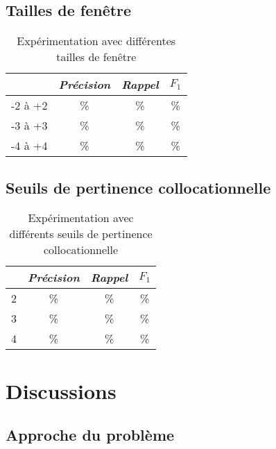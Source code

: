 \documentclass[a4paper]{article}
\begin{document}
	\subsection{Tailles de fenêtre}

		\FloatBarrier

		\begin{table}[h]
			\centering
			\begin{tabular}{l|c|c|c|}
			\cline{2-4}
				                   & \textit{Précision} & \textit{Rappel} & \textit{$F_1$} \\ \hline
			\multicolumn{1}{|l|}{-2 à +2} & \% & \% & \% \\ \hline
			\multicolumn{1}{|l|}{-3 à +3} & \% & \% & \% \\ \hline
			\multicolumn{1}{|l|}{-4 à +4} & \% & \% & \% \\ \hline
			\end{tabular}
			\caption{Expérimentation avec différentes tailles de fenêtre}
		\end{table}

	\subsection{Seuils de pertinence collocationnelle}

		\FloatBarrier

		\begin{table}[h]
			\centering
			\begin{tabular}{l|c|c|c|}
			\cline{2-4}
				                    & \textit{Précision} & \textit{Rappel} & \textit{$F_1$} \\ \hline
			\multicolumn{1}{|l|}{2} & \% & \% & \% \\ \hline
			\multicolumn{1}{|l|}{3} & \% & \% & \% \\ \hline
			\multicolumn{1}{|l|}{4} & \% & \% & \% \\ \hline
			\end{tabular}
			\caption{Expérimentation avec différents seuils de pertinence collocationnelle}
		\end{table}

		\FloatBarrier

\section{Discussions}

	\subsection{Approche du problème}
\end{document}
